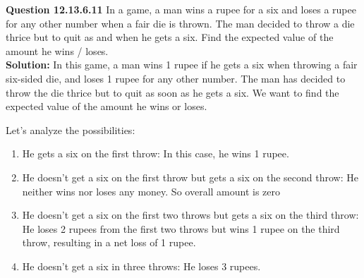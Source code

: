 \documentclass[journal,12pt,twocolumn]{IEEEtran}
\theoremstyle{remark}
\begin{document}
\newcommand{\solution}{\noindent \textbf{Solution: }}
\newcommand{\cosec}{\,\text{cosec}\,}
\providecommand{\dec}[2]{\ensuremath{\overset{#1}{\underset{#2}{\gtrless}}}}
\newcommand{\myvec}[1]{\ensuremath{\begin{pmatrix}#1\end{pmatrix}}}
\newcommand{\mydet}[1]{\ensuremath{\begin{vmatrix}#1\end{vmatrix}}}
\newcommand{\myaugvec}[2]{\ensuremath{\begin{amatrix}{#1}#2\end{amatrix}}}
\providecommand{\rank}{\text{rank}}
\providecommand{\pr}[1]{\ensuremath{\Pr\left(#1\right)}}
\providecommand{\qfunc}[1]{\ensuremath{Q\left(#1\right)}}
	\newcommand*{\permcomb}[4][0mu]{{{}^{#3}\mkern#1#2_{#4}}}
\newcommand*{\perm}[1][-3mu]{\permcomb[#1]{P}}
\newcommand*{\comb}[1][-1mu]{\permcomb[#1]{C}}
\providecommand{\qfunc}[1]{\ensuremath{Q\left(#1\right)}}
\providecommand{\gauss}[2]{\mathcal{N}\ensuremath{\left(#1,#2\right)}}
\providecommand{\diff}[2]{\ensuremath{\frac{d{#1}}{d{#2}}}}
\providecommand{\myceil}[1]{\left \lceil #1 \right \rceil }
\newcommand\figref{Fig.~\ref}
\newcommand\tabref{Table~\ref}
\newcommand{\sinc}{\,\text{sinc}\,}
\newcommand{\rect}{\,\text{rect}\,}
\let\vec\mathbf

\textbf{Question 12.13.6.11}
In a game, a man wins a rupee for a six and loses a rupee for any other number
when a fair die is thrown. The man decided to throw a die thrice but to quit as
and when he gets a six. Find the expected value of the amount he wins / loses.\\
\solution
In this game, a man wins 1 rupee if he gets a six when throwing a fair six-sided die, and loses 1 rupee for any other number. The man has decided to throw the die thrice but to quit as soon as he gets a six. We want to find the expected value of the amount he wins or loses.

Let's analyze the possibilities:

\begin{enumerate}
    \item He gets a six on the first throw: In this case, he wins 1 rupee.
    \item He doesn't get a six on the first throw but gets a six on the second throw: He neither wins nor loses any money. So overall amount is zero
    \item He doesn't get a six on the first two throws but gets a six on the third throw: He loses 2 rupees from the first two throws but wins 1 rupee on the third throw, resulting in a net loss of 1 rupee.
    \item He doesn't get a six in three throws: He loses 3 rupees.
\end{enumerate}
\end{document}
